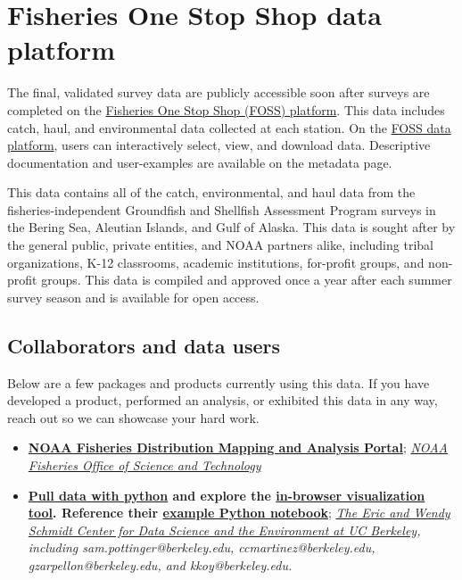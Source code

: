\documentclass[
  letterpaper,
  oneside,
  open=any]{scrbook}
\begin{document}
\section*{Fisheries One Stop Shop data
platform}\label{fisheries-one-stop-shop-data-platform}


The final, validated survey data are publicly accessible soon after
surveys are completed on the
\href{https://www.fisheries.noaa.gov/foss/}{Fisheries One Stop Shop
(FOSS) platform}. This data includes catch, haul, and environmental data
collected at each station. On the
\href{https://www.fisheries.noaa.gov/foss/}{FOSS data platform}, users
can interactively select, view, and download data. Descriptive
documentation and user-examples are available on the metadata page.

This data contains all of the catch, environmental, and haul data from
the fisheries-independent Groundfish and Shellfish Assessment Program
surveys in the Bering Sea, Aleutian Islands, and Gulf of Alaska. This
data is sought after by the general public, private entities, and NOAA
partners alike, including tribal organizations, K-12 classrooms,
academic institutions, for-profit groups, and non-profit groups. This
data is compiled and approved once a year after each summer survey
season and is available for open access.

\subsection*{Collaborators and data
users}\label{collaborators-and-data-users}

Below are a few packages and products currently using this data. If you
have developed a product, performed an analysis, or exhibited this data
in any way, reach out so we can showcase your hard work.

\begin{itemize}
\item
  \textbf{\href{https://apps-st.fisheries.noaa.gov/dismap}{NOAA
  Fisheries Distribution Mapping and Analysis Portal}};
  \emph{\href{https://www.fisheries.noaa.gov/contact/office-science-and-technology}{NOAA
  Fisheries Office of Science and Technology}}
\item
  \textbf{\href{https://pyafscgap.org/}{Pull data with python} and
  explore the \href{https://app.pyafscgap.org/'}{in-browser
  visualization tool}. Reference their
  \href{https://mybinder.org/v2/gh/SchmidtDSE/afscgap/main?urlpath=/tree/index.ipynb}{example
  Python notebook}}; \emph{\href{https://dse.berkeley.edu/}{The Eric and
  Wendy Schmidt Center for Data Science and the Environment at UC
  Berkeley}, including sam.pottinger@berkeley.edu,
  ccmartinez@berkeley.edu, gzarpellon@berkeley.edu, and
  kkoy@berkeley.edu.}
\end{itemize}
\end{document}
